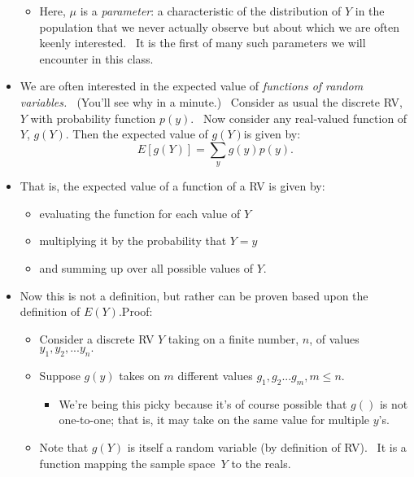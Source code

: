 \documentclass[11pt]{article}
\begin{document}
\begin{itemize}
\begin{itemize}
\item Here, $\mu $ is a \textit{parameter}: a characteristic of the
distribution of $Y$ in the population that we never actually observe but
about which we are often keenly interested. \ It is the first of many such
parameters we will encounter in this class.
\end{itemize}

\item We are often interested in the expected value of \textit{functions of
random variables. \ }(You'll see why in a minute.) \ Consider as usual the
discrete RV, $Y$ with probability function $p(y)$. \ Now consider any
real-valued function of $Y$, $g(Y).$ Then the expected value of $g(Y)$is
given by:%
\begin{equation*}
E[g(Y)]=\sum_{y}g(y)p(y).
\end{equation*}

\item That is, the expected value of a function of a RV is given by:

\begin{itemize}
\item evaluating the function for each value of $Y$

\item multiplying it by the probability that $Y=y$

\item and summing up over all possible values of $Y.$
\end{itemize}

\item Now this is not a definition, but rather can be proven based upon the
definition of $E\left( Y\right) .$Proof: \ 

\begin{itemize}
\item Consider a discrete RV $Y$ taking on a finite number, $n$, of values $%
y_{1},y_{2},...y_{n}.$

\item Suppose $g(y)$ takes on $m$ different values $g_{1},g_{2}...g_{m},m%
\leq n.$

\begin{itemize}
\item We're being this picky because it's of course possible that $g\left(
{}\right) $ is not one-to-one; that is, it may take on the same value for
multiple $y$'s.
\end{itemize}

\item Note that $g(Y)$ is itself a random variable (by definition of RV). \
It is a function mapping the sample space\ $Y$ to the reals.


\end{itemize}
\end{itemize}
\end{document}
